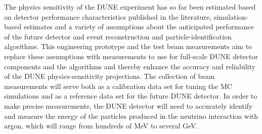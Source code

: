 
The physics sensitivity of the DUNE experiment has so far been
estimated based on detector performance characteristics published in
the literature, simulation-based estimates and a variety of
assumptions about the anticipated performance of the future detector
and event reconstruction and particle-identification algorithms.  This
engineering prototype and the test beam measurements aim to replace
these assumptions with measurements to use for full-scale DUNE
detector components and the algorithms and thereby enhance the
accuracy and reliability of the DUNE physics-sensitivity projections.
The collection of beam measurements will serve both as a calibration
data set for tuning the MC simulations and as a reference data set for
the future DUNE detector.
%
In order to make precise measurements, the DUNE  %
detector will
need to accurately identify and measure the energy of the particles
produced in the neutrino interaction with argon, which will range from
hundreds of MeV to several GeV.

